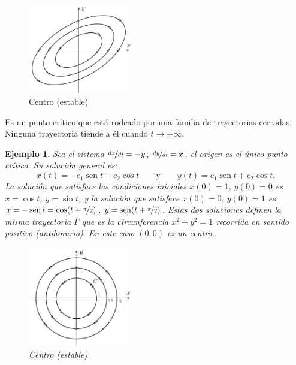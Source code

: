 \documentclass[a5paper,doc,10pt,noapacite]{apa6}
\newcommand{\yds}{\qquad\text{y}\qquad}
\DeclareMathOperator{\sen}{sen}
\newtheorem{ejem}{Ejemplo}
\begin{document}
{{\vspace{-1\baselineskip}
	\begin{figure}[H]
		\captionsetup{justification=centering, labelfont=footnotesize, font=footnotesize}
		\centering
		\includegraphics[width=4.5cm]{Graficos/figura6}
		\caption{Centro (estable)}
		\label{fig:M-6}
	\end{figure}

Es un punto crítico que está rodeado por una familia de trayectorias cerradas. Ninguna trayectoria tiende a él cuando \(t\to\pm\infty\).

\begin{ejem}
		Sea el sistema \(\nicefrac{dx}{dt}=-y\), \(\nicefrac{dy}{dt}=x\), el origen  es el único punto crítico.  Su solución general es:
		\[
		x(t) = -c_1 \sen t + c_2 \cos t 
		\yds
		y(t) = c_1 \sen t + c_2 \cos t.
		\]
		La solución que satisface las condiciones iniciales \(x(0)=1\), \(y(0)=0\) es  \(x=\cos t\), \(y=\sin t\), y la solución que satisface \(x(0)=0\), \(y(0)=1\) es \(x=-\sen t=\cos(t+\nicefrac{\pi}{2})\), \(y=\sen(t+\nicefrac{\pi}{2})\). Estas dos soluciones definen la misma trayectoria \(\Gamma\) que es la circunferencia \(x^2+y^2=1\) recorrida en sentido positivo (antihorario). En este caso \((0,0)\) es un centro.
		
		\vspace{-1\baselineskip}
	\begin{figure}[H]
		\captionsetup{justification=centering, labelfont=footnotesize, font=footnotesize}
		\centering
		\includegraphics[width=4.5cm]{Graficos/figura7}
		\caption{Centro (estable)}
		\label{fig:M-7}
	\end{figure}		
	\end{ejem}	

}}
\end{document}
